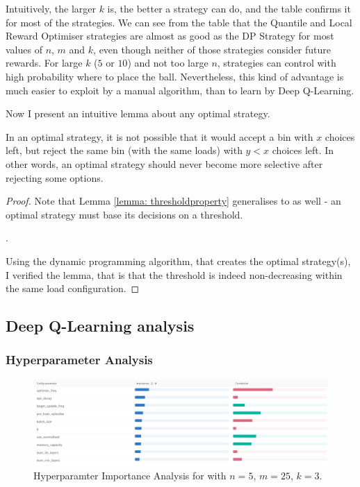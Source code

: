 Intuitively, the larger $k$ is, the better a strategy can do, and the table confirms it for most of the strategies. We can see from the table that the Quantile and Local Reward Optimiser strategies are almost as good as the DP Strategy for most values of $n$, $m$ and $k$, even though neither of those strategies consider future rewards. For large $k$ ($5$ or $10$) and not too large $n$, strategies can control with high probability where to place the ball. Nevertheless, this kind of advantage is much easier to exploit by a manual algorithm, than to learn by Deep Q-Learning.



Now I present an intuitive lemma about any optimal strategy.


\begin{lemma} \label{lemma: k-thinning-increasing-threshold}
In an optimal strategy, it is not possible that it would accept a bin with $x$ choices left, but reject the same bin (with the same loads) with $y<x$ choices left. In other words, an optimal strategy should never become more selective after rejecting some options.
\end{lemma}


\begin{proof}
Note that Lemma \ref{lemma: thresholdproperty} generalises to \KThinning as well - an optimal strategy must base its decisions on a threshold.


.


Using the dynamic programming algorithm, that creates the optimal strategy(s), I verified the lemma, that is that the threshold is indeed non-decreasing within the same load configuration.
\end{proof}


\subsection{Deep Q-Learning analysis}



\subsubsection{Hyperparameter Analysis}


\begin{figure}[hbt!] \label{k-thinning-hyperparameter-analysis}
    \centering
    \includegraphics[scale=0.4]{Chapter4/Figs/Hyperparameter_analysis_5_25_3.png}
    \caption{Hyperparamter Importance Analysis for \KThinning with $n=5$, $m=25$, $k=3$.}
\end{figure}


